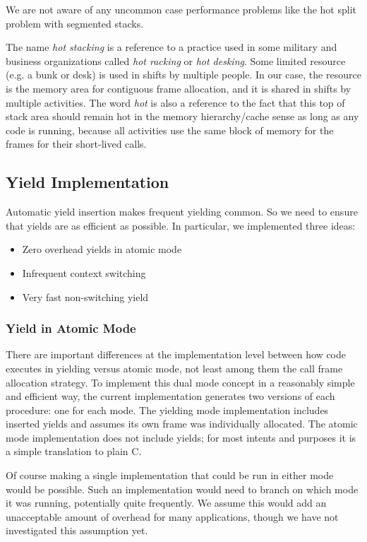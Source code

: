 \documentclass[9pt,preprint]{sigplanconf}
\begin{document}
We are not aware of any uncommon case performance problems like the hot split problem with segmented stacks.

The name \emph{hot stacking} is a reference to a practice used in some military and business organizations called \emph{hot racking} or \emph{hot desking}.
Some limited resource (e.g. a bunk or desk) is used in shifts by multiple people.
In our case, the resource is the memory area for contiguous frame allocation, and it is shared in shifts by multiple activities.
The word \emph{hot} is also a reference to the fact that this top of stack area should remain hot in the memory hierarchy/cache sense as long as any code is running, because all activities use the same block of memory for the frames for their short-lived calls.

\subsection{Yield Implementation}
\label{sec:yield_imp}

Automatic yield insertion makes frequent yielding common.
So we need to ensure that yields are as efficient as possible.
In particular, we implemented three ideas:

\begin{itemize}
\item Zero overhead yields in atomic mode
\item Infrequent context switching
\item Very fast non-switching yield
\end{itemize}

\subsubsection{Yield in Atomic Mode}

There are important differences at the implementation level between how code executes in yielding versus atomic mode, not least among them the call frame allocation strategy.
To implement this dual mode concept in a reasonably simple and efficient way, the current \charcoal{} implementation generates two versions of each procedure: one for each mode.
The yielding mode implementation includes inserted yields and assumes its own frame was individually allocated.
The atomic mode implementation does not include yields; for most intents and purposes it is a simple translation to plain C.

Of course making a single implementation that could be run in either mode would be possible.
Such an implementation would need to branch on which mode it was running, potentially quite frequently.
We assume this would add an unacceptable amount of overhead for many applications, though we have not investigated this assumption yet.
\end{document}
